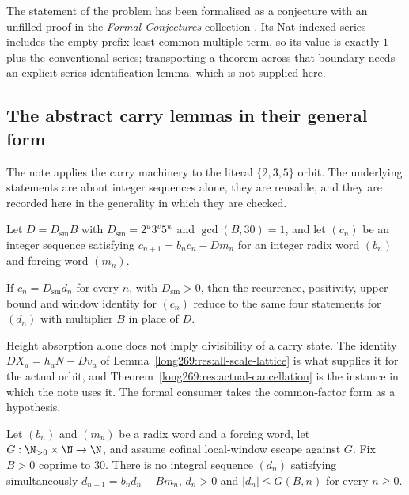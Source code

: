 \documentclass[11pt]{article}
\begin{document}
The statement of the problem has been formalised as a conjecture with an
unfilled proof in the \emph{Formal Conjectures} collection
\cite{formalconjectures269}.  Its Nat-indexed series includes the empty-prefix
least-common-multiple term, so its value is exactly \(1\) plus the conventional
series; transporting a theorem across that boundary needs an
explicit series-identification lemma, which is not supplied here.

\subsection{The abstract carry lemmas in their general form}
\label{long269:long:general-carries}

The note applies the carry machinery to the literal $\{2,3,5\}$ orbit.  The
underlying statements are about integer sequences alone, they are reusable, and
they are recorded here in the generality in which they are checked.

Let $D=D_{\mathrm{sm}}B$ with $D_{\mathrm{sm}}=2^{u}3^{v}5^{w}$ and
$\gcd(B,30)=1$, and let $(c_n)$ be an integer sequence satisfying
$c_{n+1}=b_nc_n-Dm_n$ for an integer radix word $(b_n)$ and forcing word
$(m_n)$.

\begin{proposition}
\label{long269:long:denominator-reduction}
If $c_n=D_{\mathrm{sm}}d_n$ for every $n$, with $D_{\mathrm{sm}}>0$, then the
recurrence, positivity, upper bound and window identity for $(c_n)$ reduce to
the same four statements for $(d_n)$ with multiplier $B$ in place of $D$.
\end{proposition}

Height absorption alone does not imply divisibility of a carry state.  The
identity $DX_a=h_aN-Dv_a$ of Lemma~\ref{long269:res:all-scale-lattice} is what supplies
it for the actual orbit, and Theorem~\ref{long269:res:actual-cancellation} is the
instance in which the note uses it.  The formal consumer takes the
common-factor form as a hypothesis.

\begin{proposition}
\label{long269:long:windowconsumer}
Let $(b_n)$ and $(m_n)$ be a radix word and a forcing word, let
$G:\N_{>0}\times\N\to\N$, and assume cofinal local-window escape against $G$.
Fix $B>0$ coprime to $30$.  There is no integral sequence $(d_n)$ satisfying
simultaneously $d_{n+1}=b_nd_n-Bm_n$, $d_n>0$ and $|d_n|\le G(B,n)$ for every
$n\ge0$.
\end{proposition}
\end{document}
